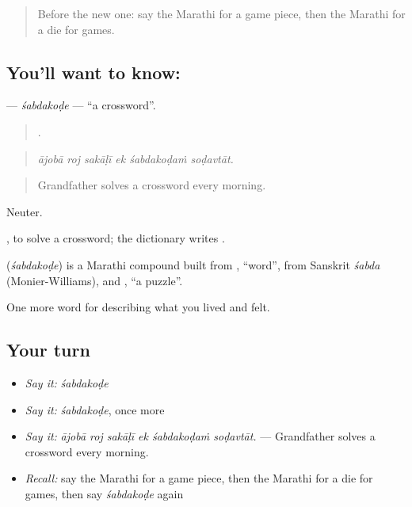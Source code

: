 \label{lesson:MR-C532-sabdakode}



\begin{quote}
Before the new one: say the Marathi for a game piece, then the Marathi for a die for games.
\end{quote}

\subsection*{You'll want to know: }
\textbf{} — \emph{śabdakoḍe} — \textquotedblleft{}a crossword\textquotedblright{}.

\begin{quote}
     .
\end{quote}

\begin{quote}
\emph{ājobā roj sakāḷī ek śabdakoḍaṁ soḍavtāt.}
\end{quote}

\begin{quote}
Grandfather solves a crossword every morning.
\end{quote}

Neuter.

 , to solve a crossword; the dictionary writes .

\begin{cousinweb}
\textbf{} (\emph{śabdakoḍe}) is a Marathi compound built from , \textquotedblleft{}word\textquotedblright{}, from Sanskrit \emph{śabda} (Monier-Williams), and , \textquotedblleft{}a puzzle\textquotedblright{}.
\end{cousinweb}

\begin{grammarlens}[title={What you've built}]
One more word for describing what you lived and felt.
\end{grammarlens}

\subsection*{Your turn}
\begin{itemize}
\raggedright
  \item \emph{Say it:} \emph{śabdakoḍe}
  \item \emph{Say it:} \emph{śabdakoḍe}, once more
  \item \emph{Say it:} \emph{ājobā roj sakāḷī ek śabdakoḍaṁ soḍavtāt.} — Grandfather solves a crossword every morning.
  \item \emph{Recall:} say the Marathi for a game piece, then the Marathi for a die for games, then say \emph{śabdakoḍe} again
\end{itemize}

